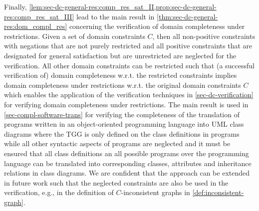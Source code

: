 Finally, \cref{lem:sec-dc-general-res:comp_res_sat_II,prop:sec-dc-general-res:comp_res_sat_III} lead to the main result in \cref{thm:sec-dc-general-res:dom_compl_res} concerning the verification of domain completeness under restrictions.
Given a set of domain constraints $C$, then all non-positive constraints with negations that are not purely restricted and all positive constraints that are designated for general satisfaction but are 
unrestricted are neglected for the verification.
All other domain constraints can be restricted such that (a successful verification of) domain completeness w.r.t. the restricted constraints implies domain completeness under restrictions w.r.t. the original domain constraints $C$ which enables the application of the verification techniques in \cref{sec-dc-verification} for verifying domain completeness under restrictions.
The main result is used in \cref{sec-compl-software-trans} for verifying the completeness of the translation of programs written in an object-oriented programming language into UML class diagrams where the TGG is only defined on the class definitions in programs while all other syntactic aspects of programs are neglected and it must be ensured that all class definitions an all possible programs over the programming language can be translated into corresponding classes, attributes and inheritance relations in class diagrams.
We are confident that the approach can be extended in future work such that the neglected constraints are also be used in the verification, e.g., in the definition of $C$-inconsistent graphs in \cref{def:inconsistent-graph}.

